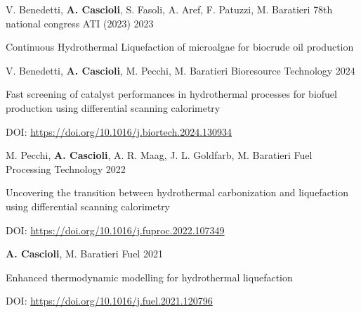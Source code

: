 
\begin{cventries}

\cventry
{V. Benedetti, \textbf{A. Cascioli}, S. Fasoli, A. Aref, F. Patuzzi, M. Baratieri}
{78th national congress ATI (2023)}
{}
{2023}
{\begin{cvitems}
\item {Continuous Hydrothermal Liquefaction of microalgae for biocrude oil production}
\end{cvitems}}

\cventry
{V. Benedetti, \textbf{A. Cascioli}, M. Pecchi, M. Baratieri}
{Bioresource Technology}
{}
{2024}
{\begin{cvitems}
\item {Fast screening of catalyst performances in hydrothermal processes for biofuel production using differential scanning calorimetry}
\item {DOI: \href{https://doi.org/10.1016/j.biortech.2024.130934}{https://doi.org/10.1016/j.biortech.2024.130934}}
\end{cvitems}}

\cventry
{M. Pecchi, \textbf{A. Cascioli}, A. R. Maag, J. L. Goldfarb, M. Baratieri}
{Fuel Processing Technology}
{}
{2022}
{\begin{cvitems}
\item {Uncovering the transition between hydrothermal carbonization and liquefaction using differential scanning calorimetry}
\item {DOI: \href{https://doi.org/10.1016/j.fuproc.2022.107349}{https://doi.org/10.1016/j.fuproc.2022.107349}}
\end{cvitems}}

\cventry
{\textbf{A. Cascioli}, M. Baratieri}
{Fuel}
{}
{2021}
{\begin{cvitems}
\item {Enhanced thermodynamic modelling for hydrothermal liquefaction}
\item {DOI: \href{https://doi.org/10.1016/j.fuel.2021.120796}{https://doi.org/10.1016/j.fuel.2021.120796}}
\end{cvitems}}

\end{cventries}
